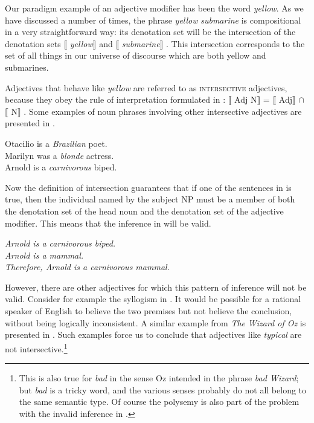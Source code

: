 Our paradigm example of an adjective modifier has been the word \textit{yellow}. As we have discussed a number of times, the phrase \textit{yellow} \textit{submarine} is compositional in a very straightforward way: its denotation set will be the intersection of the denotation sets $\llbracket$ \textit{yellow}$\rrbracket$  and $\llbracket$ \textit{submarine}$\rrbracket$ . This intersection corresponds to the set of all things in our universe of discourse which are both yellow and submarines.



Adjectives that behave like \textit{yellow} are referred to as \textsc{intersective} adjectives, because they obey the rule of interpretation formulated in : $\llbracket$ Adj N$\rrbracket$  = $\llbracket$ Adj$\rrbracket$  ${\cap}$ $\llbracket$ N$\rrbracket$ . Some examples of noun phrases involving other intersective adjectives are presented in .


\ea \label{ex:15.4}
\ea  Otacilio is a \textit{Brazilian} poet.\\
\ex Marilyn was a \textit{blonde} actress.\\
\ex Arnold is a \textit{carnivorous} biped.
                       \z
\z


Now the definition of intersection guarantees that if one of the sentences in  is true, then the individual named by the subject NP must be a member of both the denotation set of the head noun and the denotation set of the adjective modifier. This means that the inference in  will be valid.


\ea \label{ex:15.5}
\textit{Arnold is a carnivorous biped.}\\
\textit{Arnold is a mammal.\\
\FelixHRule
Therefore, Arnold is a carnivorous mammal.}
\z


However, there are other adjectives for which this pattern of inference will not be valid. Consider for example the syllogism in . It would be possible for a rational speaker of English to believe the two premises but not believe the conclusion, without being logically inconsistent. A similar example from \textit{The} \textit{Wizard of Oz} is presented in . Such examples force us to conclude that adjectives like \textit{typical} are not intersective.\footnote{This is also true for \textit{bad} in the sense Oz intended in the phrase \textit{bad Wizard}; but \textit{bad} is a tricky word, and the various senses probably do not all belong to the same semantic type. Of course the polysemy is also part of the problem with the invalid inference in .}


